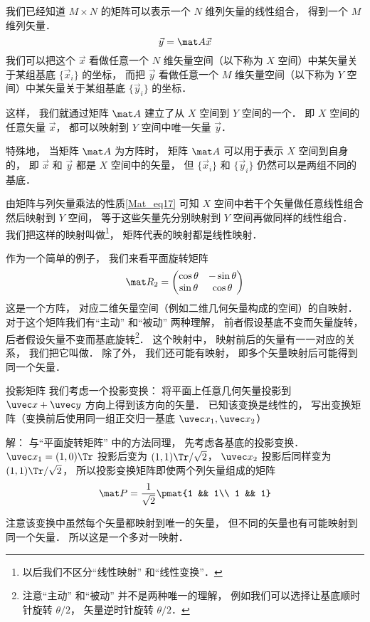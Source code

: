 

我们已经知道 $M\times N$ 的矩阵可以表示一个 $N$ 维列矢量的线性组合， 得到一个 $M$ 维列矢量．
\begin{equation}\label{MatLS_eq1}
\vec y = \mat A \vec x
\end{equation}
我们可以把这个 $\vec x$ 看做任意一个 $N$ 维矢量空间（以下称为 $X$ 空间）中某矢量关于某组基底 $\{\vec x_i\}$ 的坐标， 而把 $\vec y$ 看做任意一个 $M$ 维矢量空间（以下称为 $Y$ 空间）中某矢量关于某组基底 $\{\vec y_i\}$ 的坐标．

这样， 我们就通过矩阵 $\mat A$ 建立了从 $X$ 空间到 $Y$ 空间的一个． 即 $X$ 空间的任意矢量 $\vec x$， 都可以映射到 $Y$ 空间中唯一矢量 $\vec y$．

特殊地， 当矩阵 $\mat A$ 为方阵时， 矩阵 $\mat A$ 可以用于表示 $X$ 空间到自身的， 即 $\vec x$ 和 $\vec y$ 都是 $X$ 空间中的矢量， 但 $\{\vec x_i\}$ 和 $\{\vec y_i\}$ 仍然可以是两组不同的基底．

由矩阵与列矢量乘法的性质\autoref{Mat_eq17} 可知 $X$ 空间中若干个矢量做任意线性组合然后映射到 $Y$ 空间， 等于这些矢量先分别映射到 $Y$ 空间再做同样的线性组合． 我们把这样的映射叫做\footnote{以后我们不区分“线性映射” 和“线性变换”．}， 矩阵代表的映射都是线性映射．

作为一个简单的例子， 我们来看平面旋转矩阵
\begin{equation}
\mat R_2 = \begin{pmatrix}
\cos\theta & - \sin\theta\\
\sin\theta &\cos\theta
\end{pmatrix}
\end{equation}
这是一个方阵， 对应二维矢量空间（例如二维几何矢量构成的空间）的自映射． 对于这个矩阵我们有“主动” 和“被动” 两种理解， 前者假设基底不变而矢量旋转， 后者假设矢量不变而基底旋转\footnote{注意“主动” 和“被动” 并不是两种唯一的理解， 例如我们可以选择让基底顺时针旋转 $\theta/2$， 矢量逆时针旋转 $\theta/2$．}． 这个映射中， 映射前后的矢量有一一对应的关系， 我们把它叫做． 除了外， 我们还可能有映射， 即多个矢量映射后可能得到同一个矢量．

\begin{exam}{投影矩阵}\label{MatLS_ex1}
我们考虑一个投影变换： 将平面上任意几何矢量投影到 $\uvec x + \uvec y$ 方向上得到该方向的矢量． 已知该变换是线性的， 写出变换矩阵（变换前后使用同一组正交归一基底 $\uvec x_1, \uvec x_2$）

解： 与“平面旋转矩阵” 中的方法同理， 先考虑各基底的投影变换． $\uvec x_1 = (1, 0)\Tr$ 投影后变为 $(1, 1)\Tr /\sqrt2$， $\uvec x_2$ 投影后同样变为 $(1, 1)\Tr /\sqrt2$， 所以投影变换矩阵即使两个列矢量组成的矩阵
\begin{equation}
\mat P = \frac{1}{\sqrt{2}} \pmat{1 && 1\\ 1 && 1}
\end{equation}

注意该变换中虽然每个矢量都映射到唯一的矢量， 但不同的矢量也有可能映射到同一个矢量． 所以这是一个多对一映射．
\end{exam}

